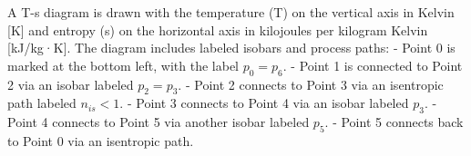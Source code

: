 A T-s diagram is drawn with the temperature (T) on the vertical axis in Kelvin [K] and entropy (s) on the horizontal axis in kilojoules per kilogram Kelvin [kJ/kg·K]. The diagram includes labeled isobars and process paths:  
- Point 0 is marked at the bottom left, with the label \( p_0 = p_6 \).  
- Point 1 is connected to Point 2 via an isobar labeled \( p_2 = p_3 \).  
- Point 2 connects to Point 3 via an isentropic path labeled \( n_{is} < 1 \).  
- Point 3 connects to Point 4 via an isobar labeled \( p_3 \).  
- Point 4 connects to Point 5 via another isobar labeled \( p_5 \).  
- Point 5 connects back to Point 0 via an isentropic path.